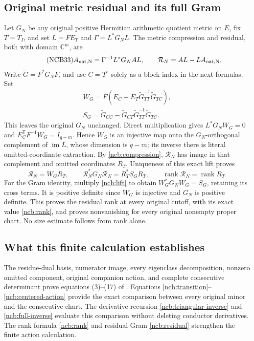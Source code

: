\documentclass[11pt,a4paper]{article}
\begin{document}
\subsection{Original metric residual and its full Gram}
Let $G_N$ be any original positive Hermitian arithmetic quotient metric
on $E$, fix $T=T_I$, and set $L=FE_T$ and $\Gamma=L^*G_NL$.
The metric compression and residual, both with domain $\mathbb C^m$,
are
\begin{equation}\tag{NCB33}\label{ncb:compression}
A_{\rm nat,N}=\Gamma^{-1}L^*G_NAL,\qquad
\mathcal R_N=AL-LA_{\rm nat,N}.
\end{equation}
Write $\widetilde G=F^*G_NF$, and use $C=T^c$ solely as a block
index in the next formulas. Set
\begin{equation}\tag{NCB34}\label{ncb:lift}
\begin{gathered}
W_G=F(E_C-E_T\widetilde G_{TT}^{-1}\widetilde G_{TC}),\\
S_G=\widetilde G_{CC}
 -\widetilde G_{CT}\widetilde G_{TT}^{-1}\widetilde G_{TC}.
\end{gathered}
\end{equation}
This leaves the original $G_N$ unchanged. Direct multiplication gives
$L^*G_NW_G=0$ and $E_C^{\mathsf T}F^{-1}W_G=I_{q-m}$.
Hence $W_G$ is an injective map onto the $G_N$-orthogonal complement
of $\operatorname{im}L$, whose dimension is $q-m$; its inverse there
is literal omitted-coordinate extraction.
By \eqref{ncb:compression}, $\mathcal R_N$ has image in that
complement and omitted coordinates $R_T$. Uniqueness of this exact
lift proves
\begin{equation}\tag{NCB35}\label{ncb:residual}
\mathcal R_N=W_GR_T,\qquad
\mathcal R_N^*G_N\mathcal R_N=R_T^*S_GR_T,\qquad
\operatorname{rank}\mathcal R_N=\operatorname{rank}R_T .
\end{equation}
For the Gram identity, multiply \eqref{ncb:lift} to obtain
$W_G^*G_NW_G=S_G$, retaining its cross terms.
It is positive definite since $W_G$ is injective and $G_N$ is
positive definite. This proves the residual rank at every original
cutoff, with its exact value \eqref{ncb:rank}, and proves nonvanishing
for every original nonempty proper chart. No size estimate follows
from rank alone.

\subsection{What this finite calculation establishes}
The residue-dual basis, numerator image, every eigenclass
decomposition, nonzero omitted component, original companion action,
and complete consecutive determinant prove equations (3)--(17) of
\cite{prog:arrival02}. Equations
\eqref{ncb:transition}--\eqref{ncb:centered-action} provide the exact
comparison between every original minor and the consecutive chart.
The derivative recursion \eqref{ncb:triangular-inverse} and
\eqref{ncb:full-inverse} evaluate this comparison without deleting
conductor derivatives. The rank formula \eqref{ncb:rank} and residual
Gram \eqref{ncb:residual} strengthen the finite action calculation.
\end{document}
